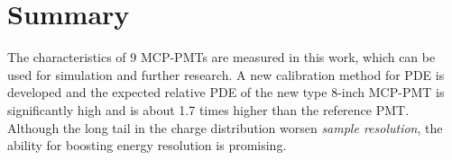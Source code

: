 \section{Summary}
\label{Summary}
The characteristics of 9 MCP-PMTs are measured in this work, which can be used for simulation and further research. A new calibration method for PDE is developed and the expected relative PDE of the new type 8-inch MCP-PMT is significantly high and is about 1.7 times higher than the reference PMT. Although the long tail in the charge distribution worsen \emph{sample resolution}, the ability for boosting energy resolution is promising.